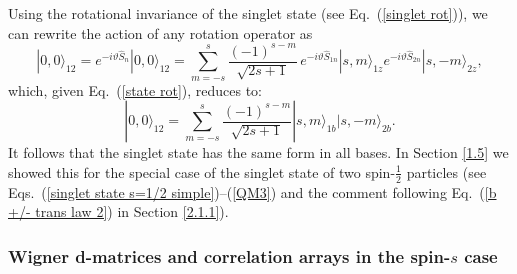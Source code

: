 
Using the rotational invariance of the singlet state (see Eq.\ (\ref{singlet rot})), we can rewrite the action of any rotation operator as
\begin{equation}
|0,0\rangle_{\!12} 
= e^{-i\vartheta \hat{S}_{n}} |0,0\rangle_{\!12} = \sum_{m=-s}^s \frac{(-1)^{s-m}}{\sqrt{2s+1}} \, e^{-i\vartheta \hat{S}_{1n}} |s,m\rangle_{1z} e^{-i\vartheta  \hat{S}_{2n}}|s,-m\rangle_{2z},
\label{spin11} 
\end{equation}
which, given Eq.\ (\ref{state rot}), reduces to: 
\begin{equation}
|0,0\rangle_{\!12} = \sum_{m=-s}^s \frac{(-1)^{s-m}}{\sqrt{2s+1}} |s,m\rangle_{1b} |s,-m\rangle_{2b}.
\label{spin11a}
\end{equation}
It follows that the singlet state has the same form in all bases. In Section \ref{1.5} we showed this for the special case of the singlet state of two spin-$\frac12$ particles (see Eqs.\ (\ref{singlet state s=1/2 simple})--(\ref{QM3}) and the comment following Eq.\ (\ref{b +/- trans law 2}) in Section \ref{2.1.1}).

\subsubsection{Wigner d-matrices and correlation arrays in the spin-$s$ case} \label{2.1.3}

